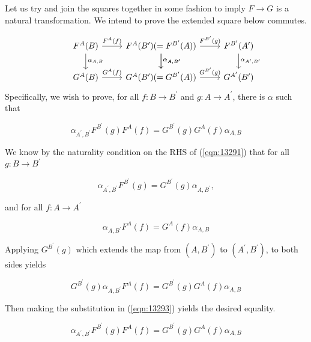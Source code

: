\documentclass{article}
\begin{document}
Let us try and join the squares together in some fashion to imply $F \rightarrow G$ is a natural transformation. We intend to prove the extended square below commutes.

\begin{equation}
\label{eqn:13291}
\begin{tikzcd}
  & F^A(B) \arrow[d,"\alpha_{A,B}"] \arrow[r, "F^A(f)"] & F^A(B^{\prime}) (= F^{B^{\prime}}(A)) \arrow[d,"{\alpha}_{A,B^{\prime}}"{name=G,right}] \arrow[d,"\alpha_{A,B^{\prime}}"] \arrow[r, "F^{B^{\prime}}(g)"] & F^{B^{\prime}}(A^{\prime}) \arrow[d,"{\alpha}_{A^{\prime},B^{\prime}}"{name=G,right}]\\
  & G^A(B) \arrow[r,"G^A(f)"] & G^A(B^{\prime}) (= G^{B^{\prime}}(A)) \arrow[r,"G^{B^{\prime}}(g)"] & G^{A^{\prime}}(B^{\prime})
\end{tikzcd}
\end{equation}
Specifically, we wish to prove, for all $f\colon B \rightarrow B^{\prime}$ and $g\colon A \rightarrow A^{\prime}$, there is $\alpha$ such that

\begin{equation}
\label{eqn:13292}
  \alpha_{A^{\prime},B^{\prime}}F^{B^{\prime}}(g)F^A(f) = G^{B^{\prime}}(g)G^A(f)\alpha_{A,B}
\end{equation}

We know by the naturality condition on the RHS of (\ref{eqn:13291}) that for all $g\colon B \rightarrow B^{\prime}$

\begin{equation}
\label{eqn:13293}
  \alpha_{A^{\prime},B^{\prime}}F^{B^{\prime}}(g) = G^{B^{\prime}}(g)\alpha_{A,B^\prime},
\end{equation}

and for all $f\colon A \rightarrow A^{\prime}$

\begin{equation*}
  \alpha_{A, B^\prime}F^A(f) = G^A(f)\alpha_{A,B}
\end{equation*}

Applying $G^{B^{\prime}}(g)$ which extends the map from $(A,B^\prime)$ to $(A^\prime,B^\prime)$, to both sides yields

\begin{equation*}
  G^{B^{\prime}}(g)\alpha_{A, B^\prime}F^A(f) = G^{B^{\prime}}(g)G^A(f)\alpha_{A,B}
\end{equation*}

Then making the substitution in (\ref{eqn:13293}) yields the desired equality.

\begin{equation*}
  \alpha_{A^{\prime},B^{\prime}}F^{B^{\prime}}(g)F^A(f) = G^{B^{\prime}}(g)G^A(f)\alpha_{A,B}
\end{equation*}
\end{document}
